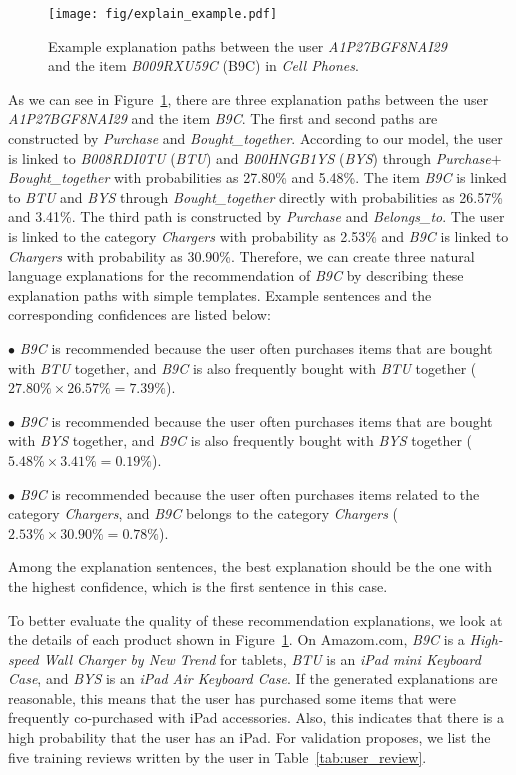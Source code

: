 \documentclass[algorithms,article,accept,moreauthors,pdftex,10pt,a4paper]{Definitions/mdpi}
\begin{document}
\begin{figure}[H]
	\texttt{[image: fig/explain\_example.pdf]}
	\caption{Example explanation paths between the user \textit{A1P27BGF8NAI29} and the item \textit{B009RXU59C} (B9C) in \textit{Cell Phones}.}\label{fig:case_study}
\end{figure}

As we can see in Figure~\ref{fig:case_study}, there are three explanation paths between the user \textit{A1P27BGF8NAI29} and the item \textit{B9C}.
The first and second paths are constructed by \textit{Purchase} and \textit{Bought\_together}.
According to our model, the user is linked to \textit{B008RDI0TU} (\textit{BTU}) and \textit{B00HNGB1YS} (\textit{BYS}) through \textit{Purchase}$+$\textit{Bought\_together} with probabilities as 27.80\% and 5.48\%.
The item \textit{B9C} is linked to \textit{BTU} and \textit{BYS} through \textit{Bought\_together} directly with probabilities as 26.57\% and 3.41\%.
The third path is constructed by \textit{Purchase} and \textit{Belongs\_to}.
The user is linked to the category \textit{Chargers} with probability as 2.53\% and \textit{B9C} is linked to \textit{Chargers} with probability as 30.90\%.
Therefore, we can create three natural language explanations for the recommendation of \textit{B9C} by describing these explanation paths with simple templates.
Example sentences and the corresponding confidences are listed below:

$\bullet$ \textit{B9C} is recommended because the user often purchases items that are bought with \textit{BTU} together, and \textit{B9C} is also frequently bought with \textit{BTU} together ($27.80\%\times 26.57\%=7.39\%$).

\vspace{6 pt} $\bullet$ \textit{B9C} is recommended because the user often purchases items that are bought with \textit{BYS} together, and \textit{B9C} is also frequently bought with \textit{BYS} together ($5.48\%\times 3.41\%=0.19\%$).

$\bullet$ \textit{B9C} is recommended because the user often purchases items related to the category \textit{Chargers}, and \textit{B9C} belongs to the category \textit{Chargers} ($2.53\%\times 30.90\%=0.78\%$).

Among the explanation sentences, the best explanation should be the one with the highest confidence, which is the first sentence in this case.



To better evaluate the quality of these recommendation explanations, we look at the details of each product shown in Figure~\ref{fig:case_study}.
On Amazom.com, \textit{B9C} is a \textit{High-speed Wall Charger by New Trend} for tablets, \textit{BTU} is an \textit{iPad mini Keyboard Case}, and \textit{BYS} is an \textit{iPad Air Keyboard Case}.
If the generated explanations are reasonable, this means that the user has purchased some items that were frequently co-purchased with iPad accessories.
Also, this indicates that there is a high probability that the user has an iPad. 
For validation proposes, we list the five training reviews written by the user in Table~\ref{tab:user_review}.
\end{document}
